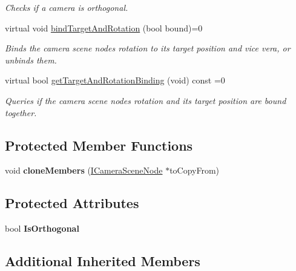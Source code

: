 \begin{DoxyCompactItemize}
\begin{DoxyCompactList}\small\item\em Checks if a camera is orthogonal. \end{DoxyCompactList}\item 
virtual void \hyperlink{classirr_1_1scene_1_1ICameraSceneNode_ad8785d7b2f730933a8d4425ac54e7205}{bind\+Target\+And\+Rotation} (bool bound)=0
\begin{DoxyCompactList}\small\item\em Binds the camera scene node\textquotesingle{}s rotation to its target position and vice vera, or unbinds them. \end{DoxyCompactList}\item 
virtual bool \hyperlink{classirr_1_1scene_1_1ICameraSceneNode_a38d308533515b921c9da6005214a1e4c}{get\+Target\+And\+Rotation\+Binding} (void) const  =0
\begin{DoxyCompactList}\small\item\em Queries if the camera scene node\textquotesingle{}s rotation and its target position are bound together. \end{DoxyCompactList}\end{DoxyCompactItemize}
\subsection*{Protected Member Functions}
\begin{DoxyCompactItemize}
\item 
void {\bfseries clone\+Members} (\hyperlink{classirr_1_1scene_1_1ICameraSceneNode}{I\+Camera\+Scene\+Node} $\ast$to\+Copy\+From)\hypertarget{classirr_1_1scene_1_1ICameraSceneNode_a5e96861b208dfbb8845748dfc35eb9b7}{}\label{classirr_1_1scene_1_1ICameraSceneNode_a5e96861b208dfbb8845748dfc35eb9b7}

\end{DoxyCompactItemize}
\subsection*{Protected Attributes}
\begin{DoxyCompactItemize}
\item 
bool {\bfseries Is\+Orthogonal}\hypertarget{classirr_1_1scene_1_1ICameraSceneNode_ab0487690db54b06683f5ceb5db2dcad1}{}\label{classirr_1_1scene_1_1ICameraSceneNode_ab0487690db54b06683f5ceb5db2dcad1}

\end{DoxyCompactItemize}
\subsection*{Additional Inherited Members}



